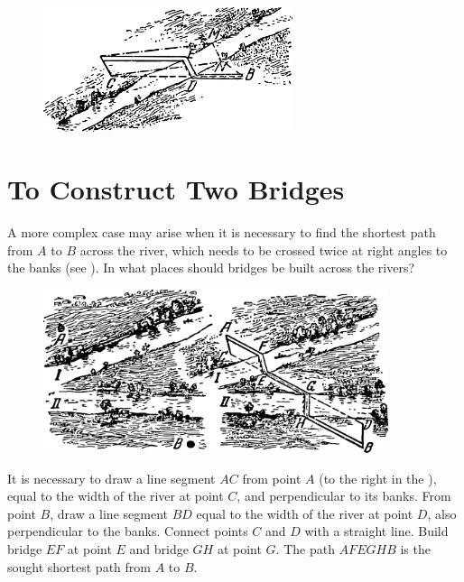 \begin{figure}[h!]
\centering
\includegraphics[width=0.65\textwidth]{figures/ch-02/fig-059.pdf}
\end{figure}


\section{To Construct Two Bridges}
\label{sec-2.18}

\ques A more complex case may arise when it is necessary to find the shortest path from $A$ to $B$ across the river, which needs to be crossed twice at right angles to the banks (see ). In what places should bridges be built across the rivers?

\begin{figure}[h!]
\centering
\includegraphics[width=0.9\textwidth]{figures/ch-02/fig-060.pdf}
\end{figure}

\ans It is necessary to draw a line segment $AC$ from point $A$ (to the right in the ), equal to the width of the river at point $C$, and perpendicular to its banks. From point $B$, draw a line segment $BD$ equal to the width of the river at point $D$, also perpendicular to the banks. Connect points $C$ and $D$ with a straight line. Build bridge $EF$ at point $E$ and bridge $GH$ at point $G$. The path $AFEGHB$ is the sought shortest path from $A$ to $B$.


